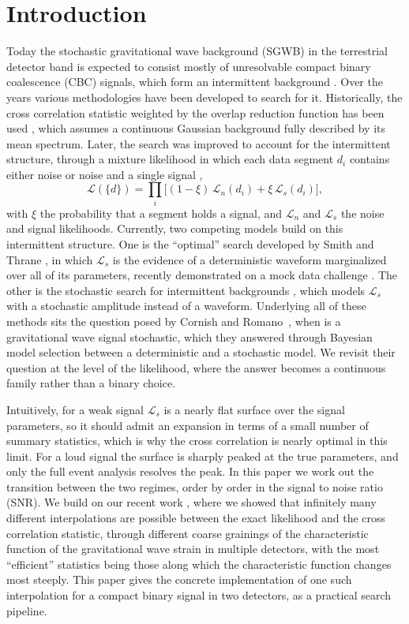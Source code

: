\documentclass[aps,prd,twocolumn,superscriptaddress,nofootinbib]{revtex4-2}
\begin{document}
\section{Introduction}

Today the stochastic gravitational wave background (SGWB) in the terrestrial detector band is expected to consist mostly of unresolvable compact binary coalescence (CBC) signals, which form an intermittent background \cite{Regimbau2011,MeacherThraneRegimbau,LVKO3iso}. Over the years various methodologies have been developed to search for it. Historically, the cross correlation statistic weighted by the overlap reduction function has been used \cite{Allen1999,Romano2017,LVKO3iso}, which assumes a continuous Gaussian background fully described by its mean spectrum. Later, the search was improved to account for the intermittent structure, through a mixture likelihood in which each data segment $d_i$ contains either noise or noise and a single signal \cite{Drasco2003},
\begin{equation}
\mathcal{L}(\{d\}) = \prod_i \big[ (1 - \xi)\, \mathcal{L}_n(d_i)
+ \xi\, \mathcal{L}_s(d_i) \big],
\label{eq:mix}
\end{equation}
with $\xi$ the probability that a segment holds a signal, and $\mathcal{L}_n$ and $\mathcal{L}_s$ the noise and signal likelihoods. Currently, two competing models build on this intermittent structure. One is the ``optimal'' search developed by Smith and Thrane \cite{Smith2018}, in which $\mathcal{L}_s$ is the evidence of a deterministic waveform marginalized over all of its parameters, recently demonstrated on a mock data challenge \cite{Kou2025}. The other is the stochastic search for intermittent backgrounds \cite{Lawrence2023}, which models $\mathcal{L}_s$ with a stochastic amplitude instead of a waveform. Underlying all of these methods sits the question posed by Cornish and Romano~\cite{CornishRomano2015}, when is a gravitational wave signal stochastic, which they answered through Bayesian model selection between a deterministic and a stochastic model. We revisit their question at the level of the likelihood, where the answer becomes a continuous family rather than a binary choice.

Intuitively, for a weak signal $\mathcal{L}_s$ is a nearly flat surface over the signal parameters, so it should admit an expansion in terms of a small number of summary statistics, which is why the cross correlation is nearly optimal in this limit. For a loud signal the surface is sharply peaked at the true parameters, and only the full event analysis resolves the peak. In this paper we work out the transition between the two regimes, order by order in the signal to noise ratio (SNR). We build on our recent work \cite{companion}, where we showed that infinitely many different interpolations are possible between the exact likelihood and the cross correlation statistic, through different coarse grainings of the characteristic function of the gravitational wave strain in multiple detectors, with the most ``efficient'' statistics being those along which the characteristic function changes most steeply. This paper gives the concrete implementation of one such interpolation for a compact binary signal in two detectors, as a practical search pipeline.
\end{document}
